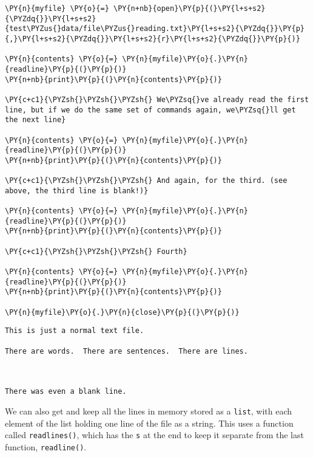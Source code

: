     \begin{tcolorbox}[breakable, size=fbox, boxrule=1pt, pad at break*=1mm,colback=cellbackground, colframe=cellborder]
\begin{Verbatim}[commandchars=\\\{\}]
\PY{n}{myfile} \PY{o}{=} \PY{n+nb}{open}\PY{p}{(}\PY{l+s+s2}{\PYZdq{}}\PY{l+s+s2}{test\PYZus{}data/file\PYZus{}reading.txt}\PY{l+s+s2}{\PYZdq{}}\PY{p}{,}\PY{l+s+s2}{\PYZdq{}}\PY{l+s+s2}{r}\PY{l+s+s2}{\PYZdq{}}\PY{p}{)}

\PY{n}{contents} \PY{o}{=} \PY{n}{myfile}\PY{o}{.}\PY{n}{readline}\PY{p}{(}\PY{p}{)}
\PY{n+nb}{print}\PY{p}{(}\PY{n}{contents}\PY{p}{)}

\PY{c+c1}{\PYZsh{}\PYZsh{}\PYZsh{} We\PYZsq{}ve already read the first line, but if we do the same set of commands again, we\PYZsq{}ll get the next line}

\PY{n}{contents} \PY{o}{=} \PY{n}{myfile}\PY{o}{.}\PY{n}{readline}\PY{p}{(}\PY{p}{)}
\PY{n+nb}{print}\PY{p}{(}\PY{n}{contents}\PY{p}{)}

\PY{c+c1}{\PYZsh{}\PYZsh{}\PYZsh{} And again, for the third. (see above, the third line is blank!)}

\PY{n}{contents} \PY{o}{=} \PY{n}{myfile}\PY{o}{.}\PY{n}{readline}\PY{p}{(}\PY{p}{)}
\PY{n+nb}{print}\PY{p}{(}\PY{n}{contents}\PY{p}{)}

\PY{c+c1}{\PYZsh{}\PYZsh{}\PYZsh{} Fourth}

\PY{n}{contents} \PY{o}{=} \PY{n}{myfile}\PY{o}{.}\PY{n}{readline}\PY{p}{(}\PY{p}{)}
\PY{n+nb}{print}\PY{p}{(}\PY{n}{contents}\PY{p}{)}

\PY{n}{myfile}\PY{o}{.}\PY{n}{close}\PY{p}{(}\PY{p}{)}
\end{Verbatim}
\end{tcolorbox}

    \begin{Verbatim}[commandchars=\\\{\}]
This is just a normal text file.

There are words.  There are sentences.  There are lines.



There was even a blank line.

    \end{Verbatim}

    We can also get and keep all the lines in memory stored as a
\texttt{list}, with each element of the list holding one line of the
file as a string. This uses a function called \texttt{readlines()},
which has the \texttt{s} at the end to keep it separate from the last
function, \texttt{readline()}.


